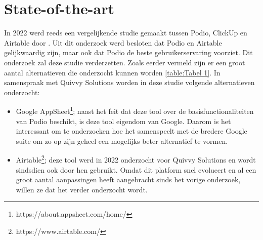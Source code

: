 
\section{State-of-the-art}%
\label{sec:state-of-the-art}


In 2022 werd reeds een vergelijkende studie gemaakt tussen Podio, ClickUp en Airtable door \textcite{Spitaels2022}. Uit dit onderzoek werd besloten dat Podio en Airtable gelijkwaardig zijn, maar ook dat Podio de beste gebruikerservaring voorziet. Dit onderzoek zal deze studie verderzetten. Zoals eerder vermeld zijn er een groot aantal alternatieven die onderzocht kunnen worden \ref{table:Tabel 1}. In samenspraak met Quivvy Solutions worden in deze studie volgende alternatieven onderzocht:

\begin{itemize}
    \item Google AppSheet\footnote{https://about.appsheet.com/home/}; naast het feit dat deze tool over de basisfunctionaliteiten van Podio beschikt, is deze tool eigendom van Google.
     Daarom is het interessant om te onderzoeken hoe het samenspeelt met de bredere Google suite om zo op zijn geheel een mogelijks beter alternatief te vormen.
    \item Airtable\footnote{https://www.airtable.com/}; deze tool werd in 2022 onderzocht voor Quivvy Solutions en wordt sindsdien ook door hen gebruikt. Omdat dit platform snel evolueert en al een groot aantal aanpassingen heeft aangebracht sinds het vorige onderzoek, willen ze dat het verder onderzocht wordt.
\end{itemize}

